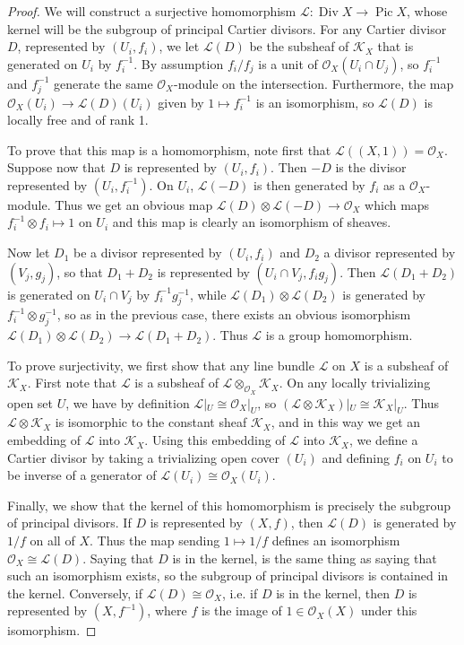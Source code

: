 \documentclass[a4paper,openany]{scrbook}
\DeclareMathOperator{\Div}{Div}
\DeclareMathOperator{\Pic}{Pic}
\begin{document}
\begin{proof} We will construct a surjective homomorphism $\mathcal{L}:\Div X\to\Pic X$, whose kernel will be the subgroup of principal Cartier divisors. For any Cartier divisor $D$, represented by $(U_i,f_i)$, we let $\mathcal{L}(D)$ be the subsheaf of $\mathcal{K}_X$ that is generated on $U_i$ by $f_i^{-1}$. By assumption $f_i/f_j$ is a unit of $\mathcal{O}_X(U_i\cap U_j)$, so $f_i^{-1}$ and $f_j^{-1}$ generate the same $\mathcal{O}_X$-module on the intersection. Furthermore, the map $\mathcal{O}_X(U_i)\to\mathcal{L}(D)(U_i)$ given by $1\mapsto f_i^{-1}$ is an isomorphism, so $\mathcal{L}(D)$ is locally free and of rank 1.

To prove that this map is a homomorphism, note first that $\mathcal{L}((X,1))=\mathcal{O}_X$. Suppose now that $D$ is represented by $(U_i,f_i)$. Then $-D$ is the divisor represented by $(U_i,f_i^{-1})$. On $U_i$, $\mathcal{L}(-D)$ is then generated by $f_i$ as a $\mathcal{O}_X$-module. Thus we get an obvious map $\mathcal{L}(D)\otimes\mathcal{L}(-D)\to\mathcal{O}_X$ which maps $f_i^{-1}\otimes f_i\mapsto 1$ on $U_i$ and this map is clearly an isomorphism of sheaves.

Now let $D_1$ be a divisor represented by $(U_i,f_i)$ and $D_2$ a divisor represented by $(V_j,g_j)$, so that $D_1+D_2$ is represented by $(U_i\cap V_j,f_ig_j)$. Then $\mathcal{L}(D_1+D_2)$ is generated on $U_i\cap V_j$ by $f_i^{-1}g_j^{-1}$, while $\mathcal{L}(D_1)\otimes\mathcal{L}(D_2)$ is generated by $f_i^{-1}\otimes g_j^{-1}$, so as in the previous case, there exists an obvious isomorphism $\mathcal{L}(D_1)\otimes\mathcal{L}(D_2)\to\mathcal{L}(D_1+D_2)$. Thus $\mathcal{L}$ is a group homomorphism.

To prove surjectivity, we first show that any line bundle $\mathcal{L}$ on $X$ is a subsheaf of $\mathcal{K}_X$. First note that $\mathcal{L}$ is a subsheaf of $\mathcal{L}\otimes_{\mathcal{O}_X}\mathcal{K}_X$. On any locally trivializing open set $U$, we have by definition $\mathcal{L}|_U\cong\mathcal{O}_X|_U$, so $(\mathcal{L}\otimes\mathcal{K}_X)|_U\cong\mathcal{K}_X|_U$. Thus $\mathcal{L}\otimes\mathcal{K}_X$ is isomorphic to the constant sheaf $\mathcal{K}_X$, and in this way we get an embedding of $\mathcal{L}$ into $\mathcal{K}_X$. Using this embedding of $\mathcal{L}$ into $\mathcal{K}_X$, we define a Cartier divisor by taking a trivializing open cover $(U_i)$ and defining $f_i$ on $U_i$ to be inverse of a generator of $\mathcal{L}(U_i)\cong\mathcal{O}_X(U_i)$.

Finally, we show that the kernel of this homomorphism is precisely the subgroup of principal divisors. If $D$ is represented by $(X,f)$, then $\mathcal{L}(D)$ is generated by $1/f$ on all of $X$. Thus the map sending $1\mapsto 1/f$ defines an isomorphism $\mathcal{O}_X\cong\mathcal{L}(D)$. Saying that $D$ is in the kernel, is the same thing as saying that such an isomorphism exists, so the subgroup of principal divisors is contained in the kernel. Conversely, if $\mathcal{L}(D)\cong\mathcal{O}_X$, i.e. if $D$ is in the kernel, then $D$ is represented by $(X,f^{-1})$, where $f$ is the image of $1\in\mathcal{O}_X(X)$ under this isomorphism.
\end{proof}
\end{document}
